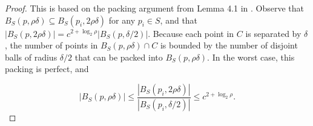 \begin{proof}
This is based on the packing argument from Lemma 4.1 in \cite{langford2006}.
Observe that $B_S(p, \rho \delta) \subseteq B_S(p_i, 2 \rho \delta)$ for any
$p_i \in S$, and that $| B_S(p, 2 \rho \delta) | = c^{2 + \log_2 \rho} |
B_S(p, \delta / 2) |$.  Because each point in $C$ is separated by $\delta$, the
number of points in $B_S(p, \rho \delta) \cap C$ is
bounded by the number of disjoint balls of radius $\delta / 2$ that can be
packed into $B_S(p, \rho \delta)$.  In the worst case, this packing is
perfect, and

\begin{equation}
|B_S(p, \rho \delta)| \le \frac{|B_S(p_i, 2 \rho \delta)|}{|B_S(p_i, \delta
/ 2)|} \le c^{2 + \log_2 \rho}.
\end{equation}
\end{proof}

